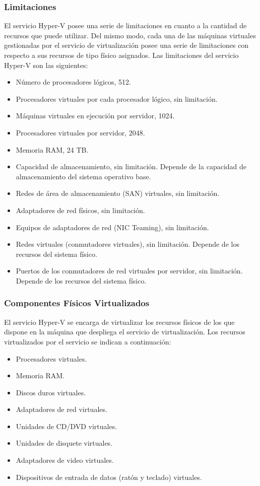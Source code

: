 \documentclass[preprint,12pt]{elsarticle}
\begin{document}
\subsubsection{\textbf{Limitaciones}}
El servicio Hyper-V posee una serie de limitaciones en cuanto a la cantidad de recursos que puede utilizar. Del
mismo modo, cada una de las máquinas virtuales gestionadas por el servicio de virtualización posee una serie de
limitaciones con respecto a sus recursos de tipo físico asignados.
Las limitaciones del servicio Hyper-V son las siguientes:
\begin{itemize}
\item Número de procesadores lógicos, 512.
\item Procesadores virtuales por cada procesador lógico, sin limitación.
\item Máquinas virtuales en ejecución por servidor, 1024.
\item Procesadores virtuales por servidor, 2048.
\item Memoria RAM, 24 TB.
\item Capacidad de almacenamiento, sin limitación. Depende de la capacidad de almacenamiento del sistema
operativo base.
\item Redes de área de almacenamiento (SAN) virtuales, sin limitación.
\item Adaptadores de red físicos, sin limitación.
\item Equipos de adaptadores de red (NIC Teaming), sin limitación.
\item Redes virtuales (conmutadores virtuales), sin limitación. Depende de los recursos del sistema físico.
\item Puertos de los conmutadores de red virtuales por servidor, sin limitación. Depende de los recursos del sistema físico.
\end{itemize}
\cite{Hyperv2019}

\subsubsection{\textbf{Componentes Físicos Virtualizados}}
El servicio Hyper-V se encarga de virtualizar los recursos físicos de los que dispone en la máquina que despliega
el servicio de virtualización.
Los recursos virtualizados por el servicio se indican a continuación:
\begin{itemize}
\item Procesadores virtuales.
\item Memoria RAM.
\item Discos duros virtuales.
\item Adaptadores de red virtuales.
\item Unidades de CD/DVD virtuales.
\item Unidades de disquete virtuales.
\item Adaptadores de video virtuales.
\item Dispositivos de entrada de datos (ratón y teclado) virtuales.
\end{itemize}
\cite{Hyperv2019}
\end{document}
